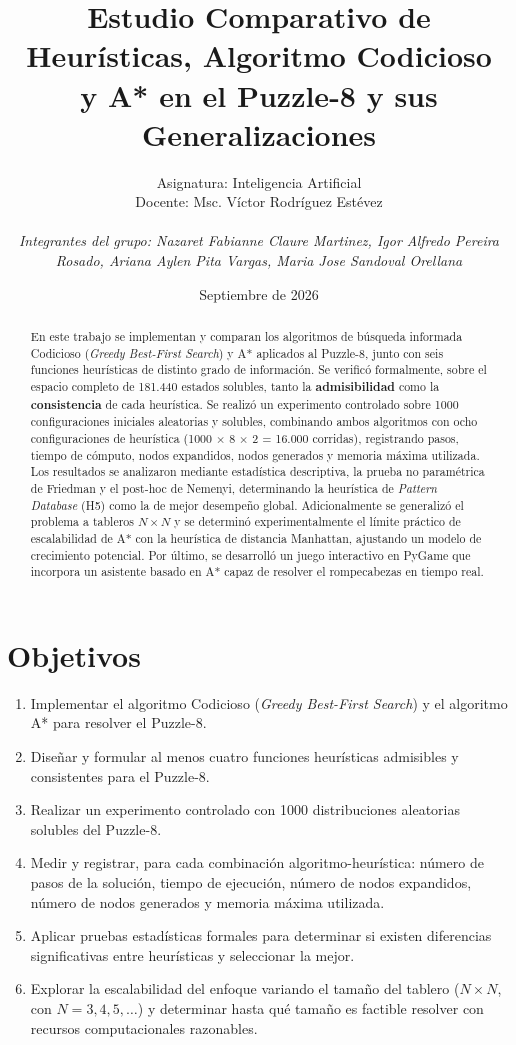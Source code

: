 \documentclass[11pt]{article}
\title{\textbf{Estudio Comparativo de Heurísticas, Algoritmo Codicioso\\
y A* en el Puzzle-8 y sus Generalizaciones}}
\author{
Asignatura: Inteligencia Artificial \\
Docente: Msc. Víctor Rodríguez Estévez \\[0.5em]
\parbox{0.9\textwidth}{\centering\itshape Integrantes del grupo: Nazaret Fabianne Claure Martinez, Igor Alfredo Pereira Rosado, Ariana Aylen Pita Vargas, Maria Jose Sandoval Orellana}
}
\date{Septiembre de 2026}
\begin{document}
\maketitle

\begin{abstract}
\noindent
En este trabajo se implementan y comparan los algoritmos de búsqueda informada
Codicioso (\textit{Greedy Best-First Search}) y A* aplicados al Puzzle-8, junto
con seis funciones heurísticas de distinto grado de información. Se verificó
formalmente, sobre el espacio completo de 181.440 estados solubles, tanto la
\textbf{admisibilidad} como la \textbf{consistencia} de cada heurística. Se
realizó un experimento controlado sobre 1000 configuraciones iniciales
aleatorias y solubles, combinando ambos algoritmos con ocho configuraciones de
heurística (1000 $\times$ 8 $\times$ 2 = 16.000 corridas), registrando pasos,
tiempo de cómputo, nodos expandidos, nodos generados y memoria máxima
utilizada. Los resultados se analizaron mediante estadística descriptiva, la
prueba no paramétrica de Friedman y el post-hoc de Nemenyi, determinando la
heurística de \textit{Pattern Database} (H5) como la de mejor desempeño
global. Adicionalmente se generalizó el problema a tableros $N\times N$ y se
determinó experimentalmente el límite práctico de escalabilidad de A* con la
heurística de distancia Manhattan, ajustando un modelo de crecimiento
potencial. Por último, se desarrolló un juego interactivo en PyGame que
incorpora un asistente basado en A* capaz de resolver el rompecabezas en
tiempo real.
\end{abstract}

\tableofcontents
\newpage

\section{Objetivos}
\begin{enumerate}
\item Implementar el algoritmo Codicioso (\textit{Greedy Best-First Search}) y
el algoritmo A* para resolver el Puzzle-8.
\item Diseñar y formular al menos cuatro funciones heurísticas admisibles y
consistentes para el Puzzle-8.
\item Realizar un experimento controlado con 1000 distribuciones aleatorias
solubles del Puzzle-8.
\item Medir y registrar, para cada combinación algoritmo-heurística: número de
pasos de la solución, tiempo de ejecución, número de nodos expandidos, número
de nodos generados y memoria máxima utilizada.
\item Aplicar pruebas estadísticas formales para determinar si existen
diferencias significativas entre heurísticas y seleccionar la mejor.
\item Explorar la escalabilidad del enfoque variando el tamaño del tablero
($N \times N$, con $N = 3,4,5,\dots$) y determinar hasta qué tamaño es
factible resolver con recursos computacionales razonables.
\end{enumerate}
\end{document}
